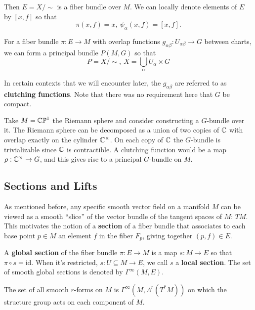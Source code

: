 		Then $E = X/\sim$ is a fiber bundle over $M$. We can locally denote elements of $E$ by $[x,f]$ so that
		\begin{equation}
			\pi(x,f) = x, ~ \psi_\alpha(x,f) = [x,f].
		\end{equation}
		
		\begin{prop}
			For a fiber bundle $\pi: E \rightarrow M$ with overlap functions $g_{\alpha \beta}: U_{\alpha \beta} \rightarrow G$ between charts, we can form a principal bundle $P(M,G)$ so that 
			\begin{equation}
				P = X/\sim, ~ X = \bigcup_\alpha U_\alpha \times G
			\end{equation}
		\end{prop}
		In certain contexts that we will encounter later, the $g_{\alpha \beta}$ are referred to as \textbf{clutching functions}.
		Note that there was no requirement here that $G$ be compact. \\
		
		\begin{eg}
			Take $M = \mathbb{CP}^1$ the Riemann sphere and consider constructing a $G$-bundle over it. The Riemann sphere can be decomposed as a union of two copies of $\mathbb{C}$ with overlap exactly on the cylinder $\mathbb{C}^{\times}$. On each copy of $\mathbb{C}$ the $G$-bundle is trivializable since $\mathbb{C}$ is contractible. A clutching function would be a map $\rho: \mathbb{C}^\times \to G$, and this gives rise to a principal $G$-bundle on $M$. 
		\end{eg}
		
		
		\subsection{Sections and Lifts}
		
		As mentioned before, any specific smooth vector field on a manifold $M$ can be viewed as a smooth ``slice'' of the vector bundle of the tangent spaces of $M$: $TM$. This motivates the notion of a \textbf{section} of a fiber bundle that associates to each base point $p\in M$ an element $f$ in the fiber $F_p$, giving together $(p,f)\in E$.
		
		A \textbf{global section} of the fiber bundle $\pi: E \rightarrow M$ is a map $s: M \rightarrow E$ so that $\pi \circ s = \text{id}$. When it's restricted, $s: U \subseteq M \rightarrow E$, we call $s$ a \textbf{local section}. The set of smooth global sections is denoted by $\Gamma^\infty (M, E)$. 
		
		\begin{eg}
			The set of all smooth $r$-forms on $M$ is $\Gamma^\infty(M, \Lambda^r (T^* M))$ on which the structure group acts on each component of $M$. %
		\end{eg}
		
